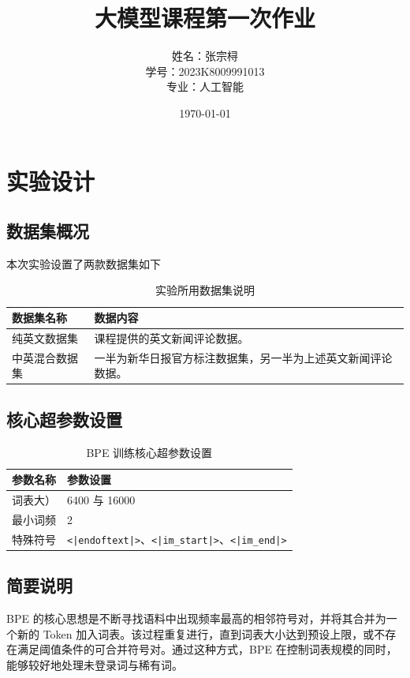 \documentclass[a4paper,12pt]{ctexart} %
\title{\textbf{大模型课程第一次作业}}
\author{姓名：张宗桪 \\ 学号：2023K8009991013 \\ 专业：人工智能}
\date{\today}
\begin{document}
\pagestyle{plain} %

\maketitle
\thispagestyle{empty} %
\newpage

\tableofcontents
\newpage
\section{实验设计}


\subsection{数据集概况}
本次实验设置了两款数据集如下

\begin{table}[H]
    \centering
    \caption{实验所用数据集说明}
    \begin{tabular}{p{} p{}}
        \toprule
        数据集名称 & 数据内容 \\
        \midrule
        纯英文数据集 & 课程提供的英文新闻评论数据。 \\
        中英混合数据集 & 一半为新华日报官方标注数据集，另一半为上述英文新闻评论数据。 \\
        \bottomrule
    \end{tabular}
\end{table}

\subsection{核心超参数设置}

\begin{table}[H]
    \centering
    \caption{BPE 训练核心超参数设置}
    \begin{tabular}{p{} p{}}
        \toprule
        参数名称 & 参数设置 \\
        \midrule
        词表大） & 6400 与 16000 \\
        最小词频 & 2 \\
        特殊符号 & \texttt{<|endoftext|>}、\texttt{<|im\_start|>}、\texttt{<|im\_end|>} \\

        \bottomrule
    \end{tabular}
\end{table}


\subsection{简要说明}
BPE 的核心思想是不断寻找语料中出现频率最高的相邻符号对，并将其合并为一个新的 Token 加入词表。该过程重复进行，直到词表大小达到预设上限，或不存在满足阈值条件的可合并符号对。通过这种方式，BPE 在控制词表规模的同时，能够较好地处理未登录词与稀有词。
\end{document}
